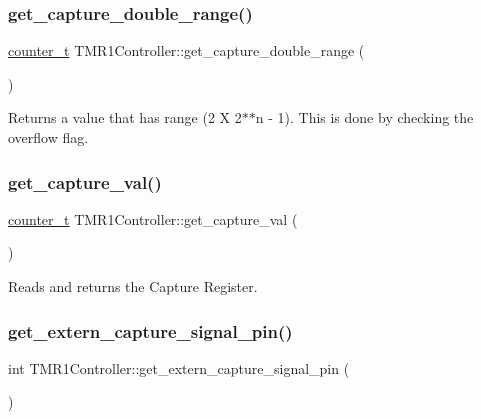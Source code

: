 \subsubsection{\texorpdfstring{get\+\_\+capture\+\_\+double\+\_\+range()}{get\_capture\_double\_range()}}
{\footnotesize\ttfamily \hyperlink{types_8hpp_a22f279793847eba127de149437848c48}{counter\+\_\+t} T\+M\+R1\+Controller\+::get\+\_\+capture\+\_\+double\+\_\+range (\begin{DoxyParamCaption}{ }\end{DoxyParamCaption})}



Returns a value that has range (2 X 2$\ast$$\ast$n -\/ 1). This is done by checking the overflow flag. 

\mbox{\label{classTMR1Controller_a3d07eed72365e7a7b44fadefb23b9ba6}} 
\subsubsection{\texorpdfstring{get\+\_\+capture\+\_\+val()}{get\_capture\_val()}}
{\footnotesize\ttfamily \hyperlink{types_8hpp_a22f279793847eba127de149437848c48}{counter\+\_\+t} T\+M\+R1\+Controller\+::get\+\_\+capture\+\_\+val (\begin{DoxyParamCaption}{ }\end{DoxyParamCaption})\hspace{0.3cm}{\ttfamily [inline]}}



Reads and returns the Capture Register. 

\mbox{\label{classTMR1Controller_a49a1a48db1600173eeb24858645a0366}} 
\subsubsection{\texorpdfstring{get\+\_\+extern\+\_\+capture\+\_\+signal\+\_\+pin()}{get\_extern\_capture\_signal\_pin()}}
{\footnotesize\ttfamily int T\+M\+R1\+Controller\+::get\+\_\+extern\+\_\+capture\+\_\+signal\+\_\+pin (\begin{DoxyParamCaption}{ }\end{DoxyParamCaption})\hspace{0.3cm}{\ttfamily [inline]}}




